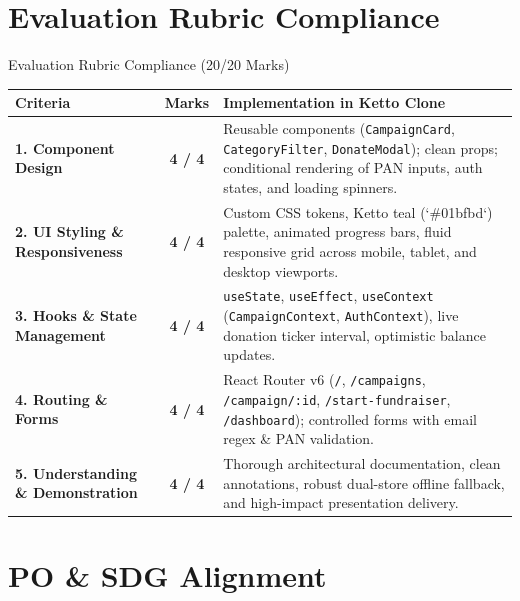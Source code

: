 \documentclass[aspectratio=169, 10pt]{beamer}
\begin{document}
\section{Evaluation Rubric Compliance}

\begin{frame}{Evaluation Rubric Compliance (20/20 Marks)}
  \begin{tabularx}{\textwidth}{P{0.8} C{0.4} P{1.8}}
    \toprule
    \textbf{Criteria} & \textbf{Marks} & \textbf{Implementation in Ketto Clone} \\
    \midrule
    \textbf{1. Component Design} & \textbf{4 / 4} & Reusable components (\texttt{CampaignCard}, \texttt{CategoryFilter}, \texttt{DonateModal}); clean props; conditional rendering of PAN inputs, auth states, and loading spinners. \\
    \addlinespace
    \textbf{2. UI Styling \& Responsiveness} & \textbf{4 / 4} & Custom CSS tokens, Ketto teal (`\#01bfbd`) palette, animated progress bars, fluid responsive grid across mobile, tablet, and desktop viewports. \\
    \addlinespace
    \textbf{3. Hooks \& State Management} & \textbf{4 / 4} & \texttt{useState}, \texttt{useEffect}, \texttt{useContext} (\texttt{CampaignContext}, \texttt{AuthContext}), live donation ticker interval, optimistic balance updates. \\
    \addlinespace
    \textbf{4. Routing \& Forms} & \textbf{4 / 4} & React Router v6 (\texttt{/}, \texttt{/campaigns}, \texttt{/campaign/:id}, \texttt{/start-fundraiser}, \texttt{/dashboard}); controlled forms with email regex \& PAN validation. \\
    \addlinespace
    \textbf{5. Understanding \& Demonstration} & \textbf{4 / 4} & Thorough architectural documentation, clean annotations, robust dual-store offline fallback, and high-impact presentation delivery. \\
    \bottomrule
  \end{tabularx}
\end{frame}

\section{PO \& SDG Alignment}
\end{document}
